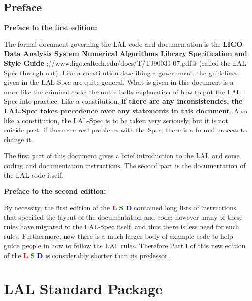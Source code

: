 \documentclass[oneside]{book}
\begin{document}
\newpage
{}
\nopagebreak
\tableofcontents


\chapter{Preface}

\bigskip
{\bf {\Huge{Preface to the first edition:}}}

\medskip
\noindent
The formal document governing the LAL-code and documentation is the
{\bf LIGO Data Analysis System Numerical Algorithms Library
Specification and Style Guide}
\verb@http://www.ligo.caltech.edu/docs/T/T990030-07.pdf@ (called the
LAL-Spec through out).  Like a constitution describing a government,
the guidelines given in the LAL-Spec are quite general. What is given
in this document  is a more like the criminal code: the nut-n-bolts
explanation of how to put the LAL-Spec into practice.  Like a
constitution, {\bf if there are any inconsistencies,  the LAL-Spec
takes precedence over any statements in this document.} Also like a
constitution, the LAL-Spec is to be taken very seriously, but it is
not suicide pact: if there are real problems with the Spec, there is a
formal process to change it.

The first part of this document gives a brief introduction to the LAL
and some coding and documentation instructions.  The second part is
the documentation of the LAL code itself.

\bigskip

\bigskip
\noindent
{\bf {\Huge{Preface to the second edition:}}}

\medskip
\noindent
By necessity, the first edition of the
{{\textcolor{red}{\bf L}} {\textcolor{green}{\bf S}} {\textcolor{blue}{\bf D}} }
contained long lists of instructions that specified the layout
of the documentation and code; however many of these rules have
migrated to the LAL-Spec itself, and thus there is less need for
such rules.  Furthermore, now there is a much
larger body of example code  to help guide people in how to
follow the LAL rules.  Therefore Part I of this new edition of
the
{{\textcolor{red}{\bf L}} {\textcolor{green}{\bf S}} {\textcolor{blue}{\bf D}} }
is considerably shorter than its predessor.


\mainmatter

\part{LAL Standard Package}


\end{document}
